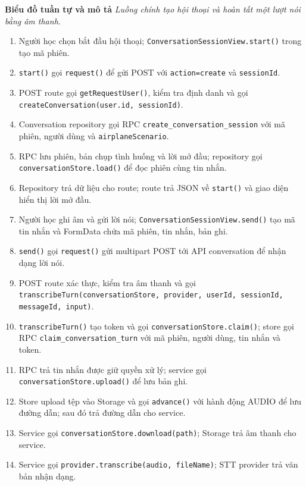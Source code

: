 \documentclass[12pt,a4paper,oneside]{report}
\begin{document}
\noindent\textbf{Biểu đồ tuần tự và mô tả}
\noindent\textit{Luồng chính tạo hội thoại và hoàn tất một lượt nói bằng âm thanh.}
\begin{enumerate}
    \item Người học chọn bắt đầu hội thoại; \texttt{ConversationSessionView.start()} trong  tạo mã phiên.
    \item \texttt{start()} gọi \texttt{request()} để gửi POST  với \texttt{action=create} và \texttt{sessionId}.
    \item POST route gọi \texttt{getRequestUser()}, kiểm tra định danh và gọi \texttt{createConversation(user.id, sessionId)}.
    \item Conversation repository gọi RPC \texttt{create\_conversation\_session} với mã phiên, người dùng và \texttt{airplaneScenario}.
    \item RPC lưu phiên, bản chụp tình huống và lời mở đầu; repository gọi \texttt{conversationStore.load()} để đọc phiên cùng tin nhắn.
    \item Repository trả dữ liệu cho route; route trả JSON về \texttt{start()} và giao diện hiển thị lời mở đầu.
    \item Người học ghi âm và gửi lời nói; \texttt{ConversationSessionView.send()} tạo mã tin nhắn và FormData chứa mã phiên, tin nhắn, bản ghi.
    \item \texttt{send()} gọi \texttt{request()} gửi multipart POST tới API conversation để nhận dạng lời nói.
    \item POST route xác thực, kiểm tra âm thanh và gọi \texttt{transcribeTurn(conversationStore, provider, userId, sessionId, messageId, input)}.
    \item \texttt{transcribeTurn()} tạo token và gọi \texttt{conversationStore.claim()}; store gọi RPC \texttt{claim\_conversation\_turn} với mã phiên, người dùng, tin nhắn và token.
    \item RPC trả tin nhắn được giữ quyền xử lý; service gọi \texttt{conversationStore.upload()} để lưu bản ghi.
    \item Store upload tệp vào Storage và gọi \texttt{advance()} với hành động AUDIO để lưu đường dẫn; sau đó trả đường dẫn cho service.
    \item Service gọi \texttt{conversationStore.download(path)}; Storage trả âm thanh cho service.
    \item Service gọi \texttt{provider.transcribe(audio, fileName)}; STT provider trả văn bản nhận dạng.

\end{enumerate}
\end{document}
